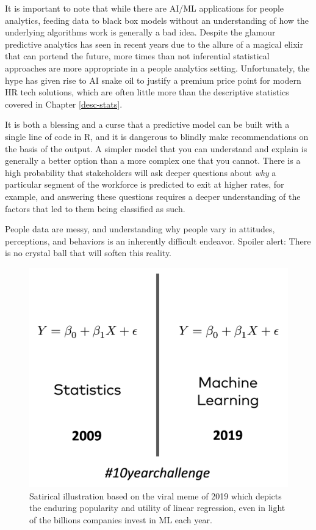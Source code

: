 \documentclass[
]{book}
\begin{document}
It is important to note that while there are AI/ML applications for people analytics, feeding data to black box models without an understanding of how the underlying algorithms work is generally a bad idea. Despite the glamour predictive analytics has seen in recent years due to the allure of a magical elixir that can portend the future, more times than not inferential statistical approaches are more appropriate in a people analytics setting. Unfortunately, the hype has given rise to AI snake oil to justify a premium price point for modern HR tech solutions, which are often little more than the descriptive statistics covered in Chapter \ref{desc-stats}.

It is both a blessing and a curse that a predictive model can be built with a single line of code in R, and it is dangerous to blindly make recommendations on the basis of the output. A simpler model that you can understand and explain is generally a better option than a more complex one that you cannot. There is a high probability that stakeholders will ask deeper questions about \emph{why} a particular segment of the workforce is predicted to exit at higher rates, for example, and answering these questions requires a deeper understanding of the factors that led to them being classified as such.

People data are messy, and understanding why people vary in attitudes, perceptions, and behaviors is an inherently difficult endeavor. Spoiler alert: There is no crystal ball that will soften this reality.

\begin{figure}

{\centering \includegraphics[width=0.75\linewidth]{graphics/stats_ml_satire} 

}

\caption{Satirical illustration based on the viral meme of 2019 which depicts the enduring popularity and utility of linear regression, even in light of the billions companies invest in ML each year.}\label{fig:stats-ml-satire}
\end{figure}
\end{document}
